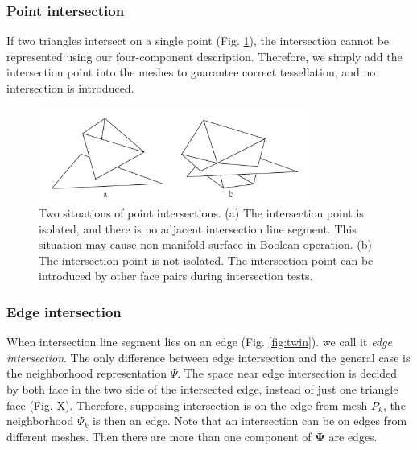 \documentclass[10pt,journal,compsoc]{IEEEtran}
\begin{document}

\subsubsection{Point intersection}
\label{sec:ipoint}
If two triangles intersect on a single point (Fig. \ref{fig:isolated}), the intersection cannot be represented using our four-component description. Therefore, we simply add the intersection point into the meshes to guarantee correct tessellation, and no intersection is introduced.

\begin{figure}[t]
\centering
\includegraphics[width=3.5in]{isolated}
\caption{Two situations of point intersections. (a) The intersection point is isolated, and there is no adjacent intersection line segment. This situation may cause non-manifold surface in Boolean operation. (b) The intersection point is not isolated. The intersection point can be introduced by other face pairs during intersection tests.}
\label{fig:isolated}
\end{figure}


\subsubsection{Edge intersection}





When intersection line segment lies on an edge (Fig. \ref{fig:twin}). we call it \emph{edge intersection}. The only difference between edge intersection and the general case is the neighborhood representation $\Psi$. The space near edge intersection is decided by both face in the two side of the intersected edge, instead of just one triangle face (Fig. X). Therefore, supposing intersection is on the edge from mesh $P_k$, the neighborhood $\Psi_k$ is then an edge. Note that an intersection can be on edges from different meshes. Then there are more than one component of $\bm{\Psi}$ are edges.
\end{document}
